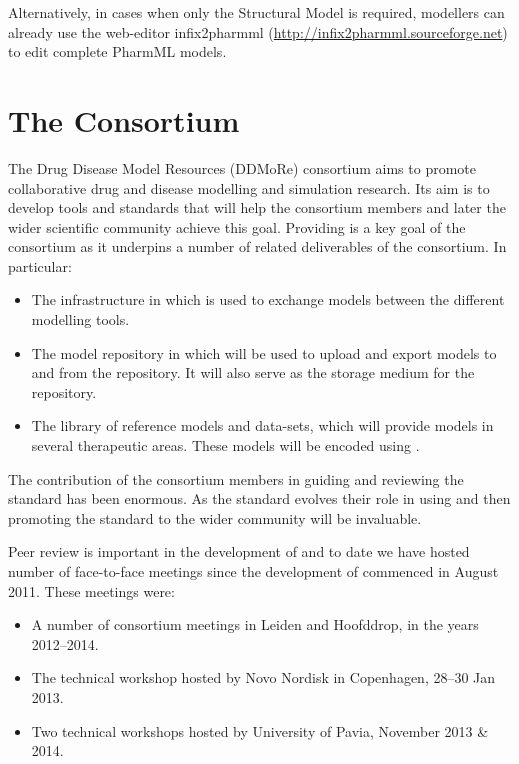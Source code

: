 Alternatively, in cases when only the Structural Model is required, modellers can 
already use the web-editor infix2pharmml (\url{http://infix2pharmml.sourceforge.net}) 
to edit complete PharmML models. 


\section{The \ddmore Consortium}


The Drug Disease Model Resources (DDMoRe) consortium aims to promote collaborative drug and disease
modelling and simulation research. Its aim is to develop tools and standards that will help the
consortium members and later the wider scientific community achieve this goal. Providing \pharmml
is a key goal of the consortium as it underpins a number of related deliverables of the consortium.
In particular:

\begin{itemize}
\item The \ddmore infrastructure in which \pharmml is used to exchange models between the different modelling tools.
\item The \ddmore model repository in which \pharmml will be used to upload and export models to and from the repository. It will also serve as the storage medium for the repository.
\item The \ddmore library of reference models and data-sets, which will provide models in several therapeutic areas. These models will be encoded using \pharmml.
\end{itemize}

The contribution of the \ddmore consortium members in guiding and reviewing the standard has been enormous.
As the standard evolves their role in using and then promoting the standard to the wider community will be invaluable.

Peer review is important in the development of \pharmml and to date we have hosted number of
face-to-face meetings since the development of \pharmml commenced in August 2011. These meetings were:

\begin{itemize}
\item A number of \ddmore consortium meetings in Leiden and Hoofddrop, in the years 2012--2014.
\item The \ddmore technical workshop hosted by Novo Nordisk in Copenhagen, 28--30 Jan 2013.
\item Two \pml technical workshops hosted by University of Pavia, November 2013 \& 2014.
\end{itemize}

